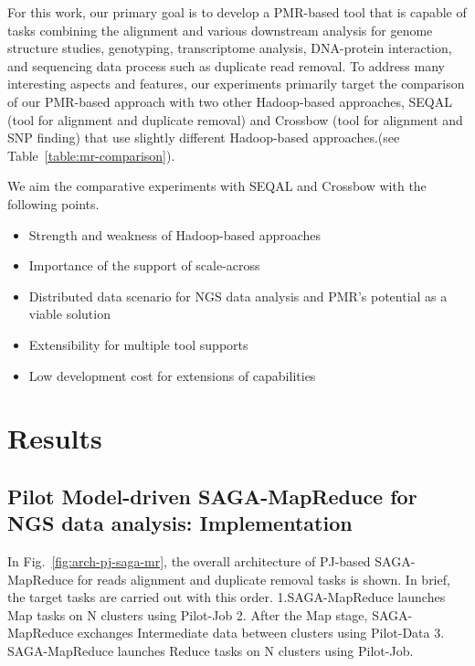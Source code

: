 \documentclass{sig-alternate}
\begin{document}
For this work, our primary goal is to develop a PMR-based tool that is capable of tasks combining the alignment and various downstream analysis for genome structure studies, genotyping, transcriptome analysis, DNA-protein interaction, and sequencing data process such as duplicate read removal.  To address many interesting aspects and features, our experiments primarily target the comparison of our PMR-based approach with two other Hadoop-based approaches, SEQAL (tool for alignment and duplicate removal) and Crossbow (tool for alignment and SNP finding) that use slightly different Hadoop-based approaches.(see Table~\ref{table:mr-comparison}).  

We aim the comparative experiments with SEQAL and Crossbow with the following points.
\begin{itemize}
\item Strength and weakness of Hadoop-based approaches
\item Importance of the support of scale-across 
\item Distributed data scenario for NGS data analysis and PMR's potential as a viable solution
\item Extensibility for multiple tool supports
\item Low development cost for extensions of capabilities
\end{itemize}





\section{Results}\label{sec:results}

\subsection{Pilot Model-driven SAGA-MapReduce for NGS data analysis: Implementation}
In Fig.~\ref{fig:arch-pj-saga-mr}, the overall architecture of PJ-based SAGA-MapReduce for reads alignment and duplicate removal tasks is shown.  In brief, the target tasks are carried out with this order. 1.SAGA-MapReduce launches Map tasks on N clusters using Pilot-Job 2. After the Map stage, SAGA-MapReduce exchanges Intermediate data between clusters using Pilot-Data  3. SAGA-MapReduce launches Reduce tasks on N clusters using Pilot-Job.
\end{document}

